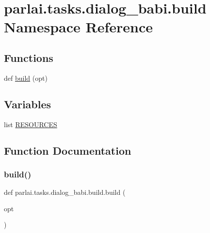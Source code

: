 \hypertarget{namespaceparlai_1_1tasks_1_1dialog__babi_1_1build}{}\section{parlai.\+tasks.\+dialog\+\_\+babi.\+build Namespace Reference}
\label{namespaceparlai_1_1tasks_1_1dialog__babi_1_1build}
\subsection*{Functions}
\begin{DoxyCompactItemize}
\item 
def \hyperlink{namespaceparlai_1_1tasks_1_1dialog__babi_1_1build_a27e45864cbef49db5548fccd56a918dd}{build} (opt)
\end{DoxyCompactItemize}
\subsection*{Variables}
\begin{DoxyCompactItemize}
\item 
list \hyperlink{namespaceparlai_1_1tasks_1_1dialog__babi_1_1build_a56f87771d583e88a5704c337bb2f569b}{R\+E\+S\+O\+U\+R\+C\+ES}
\end{DoxyCompactItemize}


\subsection{Function Documentation}
\mbox{\label{namespaceparlai_1_1tasks_1_1dialog__babi_1_1build_a27e45864cbef49db5548fccd56a918dd}} 
\subsubsection{\texorpdfstring{build()}{build()}}
{\footnotesize\ttfamily def parlai.\+tasks.\+dialog\+\_\+babi.\+build.\+build (\begin{DoxyParamCaption}\item[{}]{opt }\end{DoxyParamCaption})}



